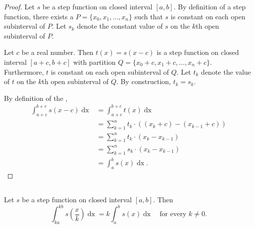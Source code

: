 \documentclass{report}
\begin{document}
\begin{proof}

  Let $s$ be a step function on closed interval $[a, b]$.
  By definition of a step function, there exists a 
    $P = \{x_0, x_1, \ldots, x_n\}$ such that $s$ is constant on each open
    subinterval of $P$.
  Let $s_k$ denote the constant value of $s$ on the $k$th open subinterval of
    $P$.

  Let $c$ be a real number.
  Then $t(x) = s(x - c)$ is a step function on closed interval $[a + c, b + c]$
    with partition $Q = \{x_0 + c, x_1 + c, \ldots, x_n + c\}$.
  Furthermore, $t$ is constant on each open subinterval of $Q$.
  Let $t_k$ denote the value of $t$ on the $k$th open subinterval of $Q$.
  By construction, $t_k = s_k$.

  By definition of the ,
    \begin{align*}
      \int_{a+c}^{b+c} s(x - c) \mathop{dx}
        & = \int_{a+c}^{b+c} t(x) \mathop{dx} \\
        & = \sum_{k=1}^n t_k \cdot ((x_k + c) - (x_{k - 1} + c)) \\
        & = \sum_{k=1}^n t_k \cdot (x_k - x_{k - 1}) \\
        & = \sum_{k=1}^n s_k \cdot (x_k - x_{k - 1}) \\
        & = \int_a^b s(x) \mathop{dx}.
    \end{align*}

\end{proof}

\subsection{}%
\label{sub:step-expansion-contraction-interval-integration}
\label{sub:theorem-1.8}

\begin{theorem}[1.8]

  Let $s$ be a step function on closed interval $[a, b]$.
  Then
    $$\int_{ka}^{kb} s \left( \frac{x}{k} \right) \mathop{dx} =
      k \int_a^b s(x) \mathop{dx} \quad\text{for every } k \neq 0.$$

\end{theorem}
\end{document}
